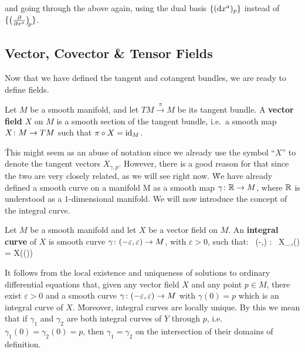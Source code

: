 and going through the above again, using the dual basis $\{(\mathrm{d} x^a)_p\}$ instead of $\{\left(\frac{\partial}{\partial {x}^{a}}\right)_{\negmedspace p}\}$.

\subsection{Vector, Covector \& Tensor Fields}

Now that we have defined the tangent and cotangent bundles, we are ready to define fields.

Let $M$ be a smooth manifold, and let $TM\xrightarrow{\,\pi\,}M$ be its tangent bundle. A \textbf{vector field} $X$ on
$M$ is a smooth section of the tangent bundle, i.e.\ a smooth map $X \colon M \to TM$ such that $\pi \circ X = \operatorname{id}_M$.
\bse
{}
\ese
\ed

\v

This might seem as an abuse of notation since we already use the symbol ``$X$'' to denote the tangent vectors
$X_{\gamma, p}$. However, there is a good reason for that since the two are very closely related, as we will see
right now. \v

We have already defined a smooth curve on a manifold M as a smooth map $\gamma\colon \mathbb{R} \to M$, where $\mathbb{R}$ is understood
as a $1$-dimensional manifold. We will now introduce the concept of the integral curve.

Let $M$ be a smooth manifold and let $X$ be a vector field on $M$. An \textbf{integral curve} of $X$ is smooth curve
$\gamma\colon(-\varepsilon,\varepsilon)\to M$, with $\varepsilon > 0$, such that:
\bse
\forall \, \lambda \in (-\varepsilon,\varepsilon) : \ X_{\gamma,\gamma(\lambda)} = X(\gamma(\lambda))
\ese
\ed

It follows from the local existence and uniqueness of solutions to ordinary differential equations that, given any
vector field $X$ and any point $p\in M$, there exist $\varepsilon >0$ and a smooth curve $\gamma\colon (-\varepsilon,
\varepsilon) \to M$ with $\gamma(0)=p$ which is an integral curve of $X$. \v

Moreover, integral curves are locally unique. By this we mean that if $\gamma_1$ and $\gamma_2$ are both integral
curves of $Y$ through $p$, i.e.\ $\gamma_1(0)=\gamma_2(0) = p$, then $\gamma_1=\gamma_2$ on the intersection of their
domains of definition.

